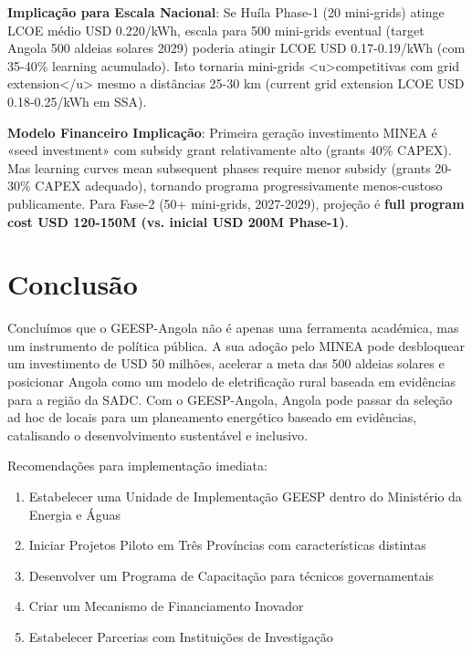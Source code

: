 \documentclass[12pt, a4paper]{article}
\begin{document}
\textbf{Implicação para Escala Nacional}: Se Huíla Phase-1 (20 mini-grids) atinge LCOE médio USD 0.220/kWh, escala para 500 mini-grids eventual (target Angola 500 aldeias solares 2029) poderia atingir LCOE USD 0.17-0.19/kWh (com 35-40\% learning acumulado). Isto tornaria mini-grids <u>competitivas com grid extension</u> mesmo a distâncias 25-30 km (current grid extension LCOE USD 0.18-0.25/kWh em SSA).


\textbf{Modelo Financeiro Implicação}: Primeira geração investimento MINEA é «seed investment» com subsidy grant relativamente alto (grants 40\% CAPEX). Mas learning curves mean subsequent phases require menor subsidy (grants 20-30\% CAPEX adequado), tornando programa progressivamente menos-custoso publicamente. Para Fase-2 (50+ mini-grids, 2027-2029), projeção é 
\textbf{full program cost USD 120-150M (vs. inicial USD 200M Phase-1)}.



\section{Conclusão}

Concluímos que o GEESP-Angola não é apenas uma ferramenta académica, mas um instrumento de política pública. A sua adoção pelo MINEA pode desbloquear um investimento de USD 50 milhões, acelerar a meta das 500 aldeias solares e posicionar Angola como um modelo de eletrificação rural baseada em evidências para a região da SADC. Com o GEESP-Angola, Angola pode passar da seleção ad hoc de locais para um planeamento energético baseado em evidências, catalisando o desenvolvimento sustentável e inclusivo.

Recomendações para implementação imediata:
\begin{enumerate}
\item Estabelecer uma Unidade de Implementação GEESP dentro do Ministério da Energia e Águas
\item Iniciar Projetos Piloto em Três Províncias com características distintas
\item Desenvolver um Programa de Capacitação para técnicos governamentais
\item Criar um Mecanismo de Financiamento Inovador
\item Estabelecer Parcerias com Instituições de Investigação
\end{enumerate}
\end{document}
